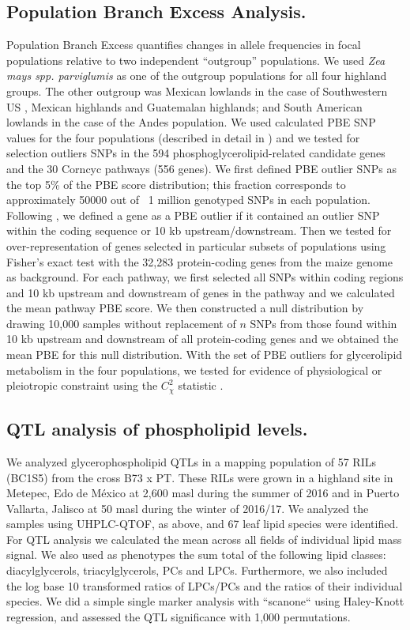 \documentclass[9pt,twocolumn,twoside,lineno]{biorxiv}
\begin{document}
\subsection{Population Branch Excess Analysis.}
Population Branch Excess quantifies changes in allele frequencies in focal populations relative to two independent “outgroup” populations.
We used \textit{Zea mays spp. parviglumis} as one of the outgroup populations for all four highland groups.  
The other outgroup was  Mexican lowlands  in the case of Southwestern US , Mexican highlands and Guatemalan highlands; and South American lowlands in the case of the Andes population. 
We used calculated PBE SNP values for the four populations (described in detail in \cite{Wang2020-mp}) and we tested for selection outliers SNPs in the 594 phosphoglycerolipid-related candidate genes and the 30 Corncyc pathways (556 genes).
We first defined PBE outlier SNPs as the top 5\% of the PBE score distribution; this fraction corresponds to approximately 50000 out of ~1 million genotyped SNPs in each population. 
Following \cite{Wang2020-mp}, we defined a gene as a PBE outlier if it contained an outlier SNP within the coding sequence or 10 kb upstream/downstream. 
Then we tested for over-representation of genes selected in particular subsets of populations using Fisher's exact test with the 32,283 protein-coding genes from the maize genome as background. 
For each pathway, we first selected all SNPs within coding regions and 10 kb upstream and downstream of genes in the pathway and we calculated the mean pathway PBE score. 
We then constructed a null distribution by drawing 10,000 samples without replacement of $n$ SNPs from those found within 10 kb upstream and downstream of all protein-coding genes and we obtained the mean PBE for this null distribution. 
With the set of PBE outliers for glycerolipid metabolism in the four populations, we tested for evidence of physiological or pleiotropic constraint using the $C_\chi^2$ statistic \cite{yeaman2018}. 
\subsection{QTL analysis of phospholipid levels.}
We analyzed glycerophospholipid QTLs in a mapping population of 57 RILs (BC1S5) from the cross B73 x PT.
These RILs were grown in a highland site in Metepec, Edo de M\'exico at 2,600 masl during the summer of 2016 and in Puerto Vallarta, Jalisco at 50 masl during the winter of 2016/17. 
We analyzed the samples using UHPLC-QTOF, as above, and 67 leaf lipid species were identified.
For QTL analysis we calculated the mean across all fields of individual lipid mass signal. 
We also used as phenotypes the sum total of the following lipid classes: diacylglycerols, triacylglycerols, PCs and  LPCs.  
Furthermore,  we also included the log base 10 transformed ratios of LPCs/PCs and the ratios of their individual species. 
We did a simple single marker analysis  with ``scanone`` using Haley-Knott  regression, and assessed the QTL significance with 1,000 permutations.
\end{document}
